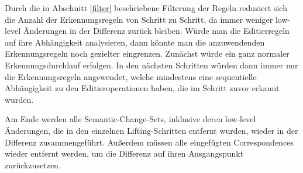 Durch die in Abschnitt \ref{filter} beschriebene Filterung der Regeln reduziert sich die Anzahl der
Erkennungsregeln von Schritt zu Schritt, da immer weniger low-level Änderungen in der Differenz
zurück bleiben. Würde man die Editierregeln auf ihre Abhängigkeit analysieren, dann könnte man die
anzuwendenden Erkennungsregeln noch gezielter eingrenzen. Zunächst würde ein ganz normaler
Erkennungsdurchlauf erfolgen. In den nächsten Schritten würden dann immer nur die Erkennungsregeln
angewendet, welche mindestens eine sequentielle Abhängigkeit zu den Editieroperationen haben, die im
Schritt zuvor erkannt wurden.

Am Ende werden alle Semantic-Change-Sets, inklusive deren low-level Änderungen, die in den einzelnen
Lifting-Schritten entfernt wurden, wieder in der Differenz zusammengeführt. Außerdem müssen alle
eingefügten Correspondences wieder entfernt werden, um die Differenz auf ihren Ausgangspunkt
zurückzusetzen.

